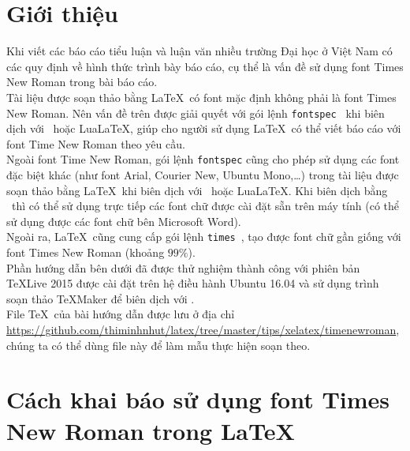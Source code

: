 \documentclass[12pt,a4paper]{article}
\begin{document}
\section{Giới thiệu}
	Khi viết các báo cáo tiểu luận và luận văn nhiều trường Đại học ở Việt Nam có các quy định về hình thức trình bày báo cáo, cụ thể là vấn đề sử dụng font Times New Roman trong bài báo cáo.\\
	
	Tài liệu được soạn thảo bằng \LaTeX\ có font mặc định không phải là font Times New Roman. Nên vấn đề trên được giải quyết với gói lệnh \verb|fontspec|~\cite{fontspec-ctan} khi biên dịch với \XeLaTeX\ hoặc Lua\LaTeX, giúp cho người sử dụng \LaTeX\ có thể viết báo cáo với font Time New Roman theo yêu cầu.\\
	
	Ngoài font Time New Roman, gói lệnh \verb|fontspec| cũng cho  phép sử dụng các font đặc biệt khác (như font Arial, Courier New, Ubuntu Mono,\ldots) trong tài liệu được soạn thảo bằng \LaTeX\ khi biên dịch với \XeLaTeX\ hoặc Lua\LaTeX. Khi biên dịch bằng \XeLaTeX\ thì có thể sử dụng trực tiếp các font chữ được cài đặt sẵn trên máy tính (có thể sử dụng được các font chữ bên Microsoft Word).\\
	
	Ngoài ra, \LaTeX\ cũng cung cấp gói lệnh \verb|times|~\cite{times-ctan}, tạo được font chữ gần giống với font Times New Roman (khoảng $99\%$).\\
	
	Phần hướng dẫn bên dưới đã được thử nghiệm thành công với phiên bản \TeX Live 2015 được cài đặt trên hệ điều hành Ubuntu 16.04 và sử dụng trình soạn thảo \TeX Maker để biên dịch với \XeLaTeX. \\
	
	File \TeX\ của bài hướng dẫn được lưu ở địa chỉ \url{https://github.com/thiminhnhut/latex/tree/master/tips/xelatex/timenewroman}, chúng ta có thể dùng file này để làm mẫu thực hiện soạn theo.

\section{Cách khai báo sử dụng font Times New Roman trong \LaTeX}
\end{document}
